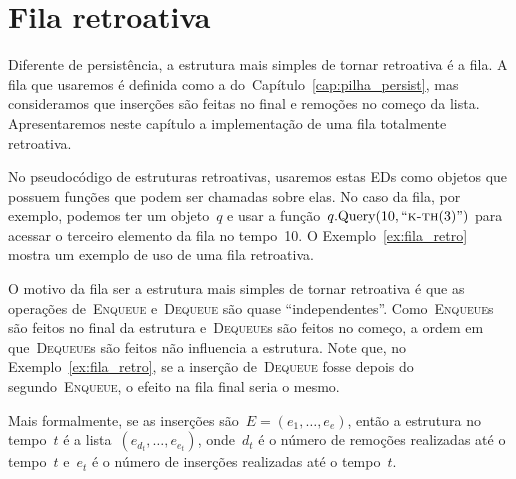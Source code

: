 \documentclass[main.tex]{subfiles}
\begin{document}
\chapter{Fila retroativa}

Diferente de persistência, a estrutura mais simples de tornar retroativa é a fila. A fila que usaremos é definida como a do~Capítulo~\ref{cap:pilha_persist}, mas consideramos que inserções são feitas no final e remoções no começo da lista. Apresentaremos neste capítulo a implementação de uma fila totalmente retroativa.

No pseudocódigo de estruturas retroativas, usaremos estas EDs como objetos que possuem funções que podem ser chamadas sobre elas. No caso da fila, por exemplo, podemos ter um objeto~$q$ e usar a função~$q.\text{Query}(10, ``\textsc{k-th}(3)")$ para acessar o terceiro elemento da fila no tempo~10. O Exemplo~\ref{ex:fila_retro} mostra um exemplo de uso de uma fila retroativa.

O motivo da fila ser a estrutura mais simples de tornar retroativa é que as operações de~\textsc{Enqueue} e~\textsc{Dequeue} são quase ``independentes''. Como~\textsc{Enqueue}s são feitos no final da estrutura e~\textsc{Dequeue}s são feitos no começo, a ordem em que~\textsc{Dequeue}s são feitos não influencia a estrutura. Note que, no Exemplo~\ref{ex:fila_retro}, se a inserção de~\textsc{Dequeue} fosse depois do segundo~\textsc{Enqueue}, o efeito na fila final seria o mesmo.

Mais formalmente, se as inserções são~$E = (e_1, \ldots, e_e)$, então a estrutura no tempo~$t$ é a lista~$(e_{d_t}, \ldots, e_{e_t})$, onde~$d_t$ é o número de remoções realizadas até o tempo~$t$ e~$e_t$ é o número de inserções realizadas até o tempo~$t$.
\end{document}
